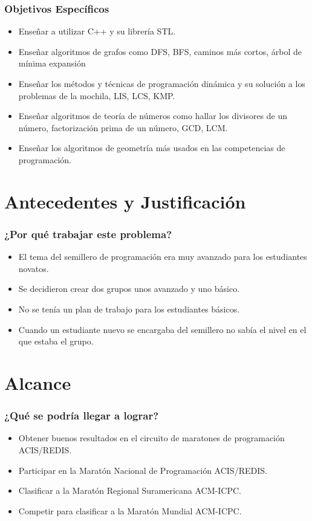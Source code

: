 \documentclass{beamer}
\begin{document}
	\begin{frame}
		\frametitle{Objetivos Específicos}
		\begin{itemize}
			\item{Enseñar a utilizar C++ y su librería STL.}
			\item{Enseñar algoritmos de grafos como DFS, BFS, caminos más cortos, árbol de mínima expansión}
			\item{Enseñar los métodos y técnicas de programación dinámica y su solución a los problemas de la mochila, LIS, LCS, KMP.}
			\item{Enseñar algoritmos de teoría de números como hallar los divisores de un número, factorización prima de un número, GCD, LCM.}
			\item{Enseñar los algoritmos de geometría más usados en las competencias de programación.}
		\end{itemize}		
	\end{frame}
	
\section{Antecedentes y Justificación}
	\begin{frame}
		\frametitle{¿Por qué trabajar este problema?}
		\begin{itemize}
			\item El tema del semillero de programación era muy avanzado para los estudiantes novatos.
			\item Se decidieron crear dos grupos unos avanzado y uno básico.
			\item No se tenía un plan de trabajo para los estudiantes básicos.
			\item Cuando un estudiante nuevo se encargaba del semillero no sabía el nivel en el que estaba el grupo.
		\end{itemize}
	\end{frame}

\section{Alcance}
	\begin{frame}
		\frametitle{¿Qué se podría llegar a lograr?}
		\begin{itemize}
			\item Obtener buenos resultados en el circuito de maratones de programación ACIS/REDIS.
			\item Participar en la Maratón Nacional de Programación ACIS/REDIS.
			\item Clasificar a la Maratón Regional Suramericana ACM-ICPC.
			\item Competir para clasificar a la Maratón Mundial ACM-ICPC.
		\end{itemize}
	\end{frame}
	
\end{document}
